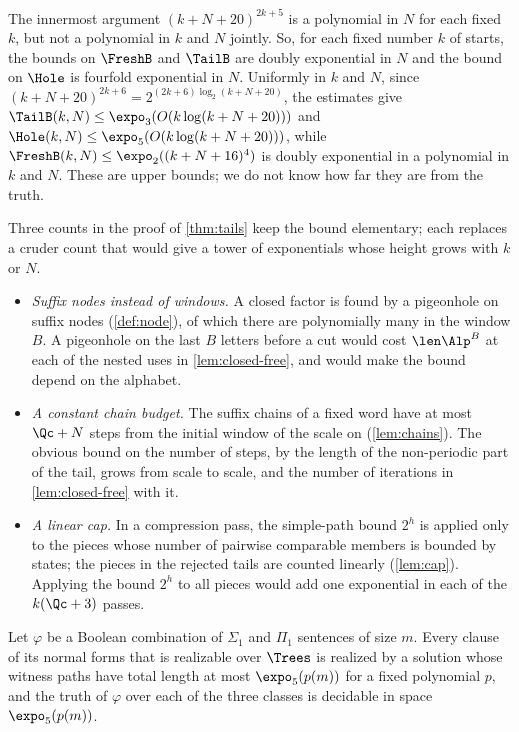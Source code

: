 The innermost argument $(k+N+20)^{2k+5}$ is a polynomial in $N$ for each
fixed $k$, but not a polynomial in $k$ and $N$ jointly. So, for each fixed
number $k$ of starts, the bounds on $\FreshB$ and $\TailB$ are doubly
exponential in $N$ and the bound on $\Hole$ is fourfold exponential in $N$.
Uniformly in $k$ and $N$, since $(k+N+20)^{2k+6}=2^{(2k+6)\log_2(k+N+20)}$,
the estimates give $\TailB(k,N)\le\expo_3(O(k\log(k+N+20)))$ and
$\Hole(k,N)\le\expo_5(O(k\log(k+N+20)))$, while $\FreshB(k,N)\le
\expo_2((k+N+16)^4)$ is doubly exponential in a polynomial in $k$ and $N$.
These are upper bounds; we do not know how far they are from the truth.

Three counts in the proof of \cref{thm:tails} keep the bound elementary;
each replaces a cruder count that would give a tower of exponentials whose
height grows with $k$ or $N$.
\begin{itemize}
\item \emph{Suffix nodes instead of windows.} A closed factor is found by a
  pigeonhole on suffix nodes (\cref{def:node}), of which there are
  polynomially many in the window $B$. A pigeonhole on the last $B$ letters
  before a cut would cost $\len\Alp^{B}$ at each of the nested uses in
  \cref{lem:closed-free}, and would make the bound depend on the alphabet.
\item \emph{A constant chain budget.} The suffix chains of a fixed word have
  at most $\Qc+N$ steps from the initial window of the scale on
  (\cref{lem:chains}). The obvious bound on the number of steps, by the
  length of the non-periodic part of the tail, grows from scale to scale,
  and the number of iterations in \cref{lem:closed-free} with it.
\item \emph{A linear cap.} In a compression pass, the simple-path bound
  $2^h$ is applied only to the pieces whose number of pairwise comparable
  members is bounded by states; the pieces in the rejected tails are counted
  linearly (\cref{lem:cap}). Applying the bound $2^h$ to all pieces would
  add one exponential in each of the $k(\Qc+3)$ passes.
\end{itemize}

\begin{corollary}[Sentences]\label{cor:complexity}
Let $\varphi$ be a Boolean combination of $\Sigma_1$ and $\Pi_1$ sentences
of size $m$. Every clause of its normal forms that is realizable over
$\Trees$ is realized by a solution whose witness paths have total length at
most $\expo_5(p(m))$ for a fixed polynomial $p$, and the truth of $\varphi$
over each of the three classes is decidable in space $\expo_5(p(m))$.
\end{corollary}


